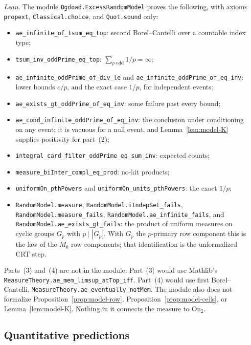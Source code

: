 \noindent\emph{Lean.}  The module \texttt{Ogdoad.ExcessRandomModel} proves
the following, with axioms \texttt{propext}, \texttt{Classical.choice}, and
\texttt{Quot.sound} only:
\begin{itemize}
\item \texttt{ae\_infinite\_of\_tsum\_eq\_top}: second Borel--Cantelli over
      a countable index type;
\item \texttt{tsum\_inv\_oddPrime\_eq\_top}: $\sum_{p\text{ odd}}1/p=\infty$;
\item \texttt{ae\_infinite\_oddPrime\_of\_div\_le} and
      \texttt{ae\_infinite\_oddPrime\_of\_eq\_inv}: lower bounds $c/p$, and
      the exact case $1/p$, for independent events;
\item \texttt{ae\_exists\_gt\_oddPrime\_of\_eq\_inv}: some failure past every
      bound;
\item \texttt{ae\_cond\_infinite\_oddPrime\_of\_eq\_inv}: the conclusion under
      conditioning on any event; it is vacuous for a null event, and
      Lemma~\ref{lem:model-K} supplies positivity for part~(2);
\item \texttt{integral\_card\_filter\_oddPrime\_eq\_sum\_inv}: expected counts;
\item \texttt{measure\_biInter\_compl\_eq\_prod}: no-hit products;
\item \texttt{uniformOn\_pthPowers} and \texttt{uniformOn\_units\_pthPowers}:
      the exact $1/p$;
\item \texttt{RandomModel.measure}, \texttt{RandomModel.iIndepSet\_fails},
      \texttt{RandomModel.measure\_fails},
      \texttt{RandomModel.ae\_infinite\_fails}, and
      \texttt{RandomModel.ae\_exists\_gt\_fails}: the product of uniform
      measures on cyclic groups $G_p$ with $p\mid|G_p|$.  With $G_p$ the
      $p$-primary row component this is the law of the $M_0$ row components;
      that identification is the unformalized CRT step.
\end{itemize}
Parts~(3) and~(4) are not in the module.  Part~(3) would use Mathlib's
\texttt{MeasureTheory.ae\_mem\_limsup\_atTop\_iff}.  Part~(4) would use
first Borel--Cantelli, \texttt{MeasureTheory.ae\_eventually\_notMem}.  The
module also does not formalize Proposition~\ref{prop:model-row},
Proposition~\ref{prop:model-cells}, or Lemma~\ref{lem:model-K}.  Nothing in
it connects the measure to $\mathrm{On}_2$.

\subsection{Quantitative predictions}\label{sec:model-numbers}

